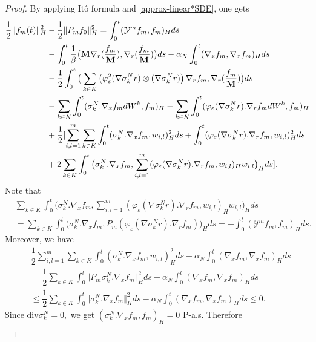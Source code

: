 \documentclass[a4paper,12pt, reqno]{amsart}
\newcommand{\Div}{\text{div}}
\begin{document}
\begin{proof} 
By applying It\^o formula and \eqref{approx-linear*SDE}, one gets
  \begin{align*}
   \dfrac{1}{2} \Vert f_m(t)\Vert_H^2&-\dfrac{1}{2}\Vert P_mf_{0}\Vert_H^2=\int_0^t(\mathcal{Y}^mf_m,f_m)_Hds  \notag\\
    &	-\int_0^t\dfrac{1}{\beta}\big(\mathbf{M}\nabla_r(\dfrac{f_m}{\mathbf{M}}),\nabla_r(\dfrac{f_m}{\mathbf{M}})\big)ds -\alpha_N\int_0^t(\nabla_x f_m,\nabla_x f_m)_Hds \notag\\&- \dfrac{1}{2}\int_0^t\big(\sum_{k\in K}\left(\varphi_\varepsilon^2(\nabla \sigma_k^Nr) \otimes (\nabla \sigma_k^Nr)\right) \nabla_rf_m,\nabla_r(\dfrac{f_m}{\mathbf{M}})\big)ds\\
            &-\sum_{k\in K}\int_0^t(\sigma_k^N.\nabla_xf_mdW^k,f_m)_H -\sum_{k\in K}\int_0^t(\varphi_\varepsilon(\nabla \sigma_k^Nr).\nabla_rf_m dW^k,f_m)_H \\
            &+\dfrac{1}{2}[\sum_{i,l=1}^m\sum_{k\in K}\int_0^t(\sigma_k^N.\nabla_xf_m,w_{i,l})_H^2 ds +\int_0^t(\varphi_\varepsilon(\nabla \sigma_k^Nr).\nabla_rf_m,w_{i,l})_H^2 ds\\
            &+2\sum_{k\in K}\int_0^t\big(\sigma_k^N.\nabla_xf_m, \sum_{i,l=1}^m(\varphi_\varepsilon(\nabla \sigma_k^Nr).\nabla_rf_m,w_{i,l})_Hw_{i,l}\big)_H ds].
\end{align*}
Note that 
\begin{align*}
    &\sum_{k\in K}\int_0^t\big(\sigma_k^N.\nabla_xf_m, \sum_{i,l=1}^m(\varphi_\varepsilon(\nabla \sigma_k^Nr).\nabla_rf_m,w_{i,l})_Hw_{i,l}\big)_H ds\\&=\sum_{k\in K}\int_0^t\big(\sigma_k^N.\nabla_xf_m, P_m(\varphi_\varepsilon(\nabla \sigma_k^Nr).\nabla_rf_m)\big)_H ds=-\int_0^t(\mathcal{Y}^mf_m,f_m)_Hds.
\end{align*}
Moreover, we have 
\begin{align*}
    &\dfrac{1}{2}\sum_{i,l=1}^m\sum_{k\in K}\int_0^t(\sigma_k^N.\nabla_xf_m,w_{i,l})_H^2 ds-\alpha_N\int_0^t(\nabla_x f_m,\nabla_x f_m)_Hds\\&=\dfrac{1}{2}\sum_{k\in K}\int_0^t\Vert P_m\sigma_k^N.\nabla_xf_m\Vert_H^2 ds-\alpha_N\int_0^t(\nabla_x f_m,\nabla_x f_m)_Hds\\
    &\leq  \dfrac{1}{2}\sum_{k\in K}\int_0^t\Vert \sigma_k^N.\nabla_xf_m\Vert_H^2 ds-\alpha_N\int_0^t(\nabla_x f_m,\nabla_x f_m)_Hds\leq 0.
\end{align*}
Since $\Div \sigma_k^N=0,$ we get $(\sigma_k^N.\nabla_xf_m,f_m)_H=0$ P-a.s. Therefore
\begin{align}

\end{align}
\end{proof}
\end{document}
